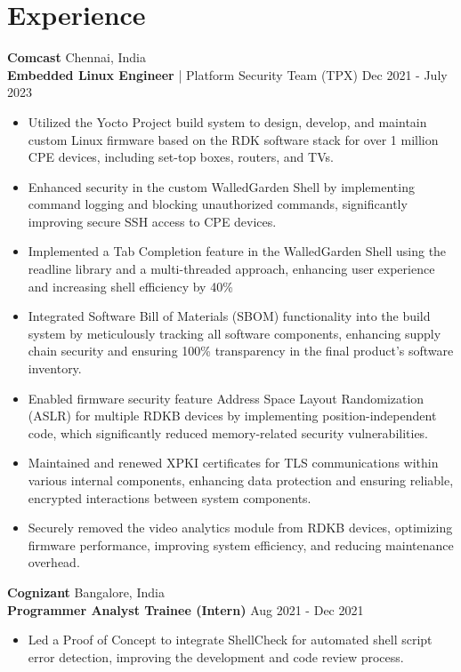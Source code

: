 \documentclass[9pt, letterpad]{extarticle}
\newcommand{\cmpnysection}[4] {
	\raggedright{\large\bfseries{#1}}
	\hfill {\small #2} \\
	{#3}
	\hfill {\small #4} \\
}
\begin{document}
\section{Experience}
\cmpnysection
{Comcast}
{Chennai, India}
{{\bfseries Embedded Linux Engineer} | Platform Security Team (TPX)}
{Dec 2021 - July 2023}
\vspace*{-0.5em}
\begin{itemize}[leftmargin=6mm]
	\setlength\itemsep{0em}
	\item{Utilized the Yocto Project build system to design, develop, and maintain custom Linux firmware based on the RDK software stack for over 1 million CPE devices, including set-top boxes, routers, and TVs.}
	\item{Enhanced security in the custom WalledGarden Shell by implementing command logging and blocking unauthorized commands, significantly improving secure SSH access to CPE devices.}
	\item{Implemented a Tab Completion feature in the WalledGarden Shell using the readline library and a multi-threaded approach, enhancing user experience and increasing shell efficiency by 40\%}
	\item{Integrated Software Bill of Materials (SBOM) functionality into the build system by meticulously tracking all software components, enhancing supply chain security and ensuring 100\% transparency in the final product's software inventory.}
	\item{Enabled firmware security feature Address Space Layout Randomization (ASLR) for multiple RDKB devices by implementing position-independent code, which significantly reduced memory-related security vulnerabilities.}
	\item{Maintained and renewed XPKI certificates for TLS communications within various internal components, enhancing data protection and ensuring reliable, encrypted interactions between system components.}
	\item{Securely removed the video analytics module from RDKB devices, optimizing firmware performance, improving system efficiency, and reducing maintenance overhead.}
\end{itemize}

\cmpnysection
{Cognizant}
{Bangalore, India}
{\bfseries Programmer Analyst Trainee (Intern)}
{Aug 2021 - Dec 2021}
\vspace*{-0.5em}
\begin{itemize}[leftmargin=6mm]
	\setlength\itemsep{0em}
	\item{Led a Proof of Concept to integrate ShellCheck for automated shell script error detection, improving the development and code review process.}
\end{itemize}
\end{document}
